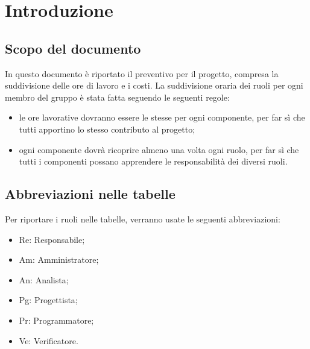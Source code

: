 \section{Introduzione}
\subsection{Scopo del documento}
In questo documento è riportato il preventivo per il progetto, compresa la suddivisione delle ore di lavoro e i costi.
La suddivisione oraria dei ruoli per ogni membro del gruppo è stata fatta seguendo le seguenti regole:
    \begin{itemize}
        \item le ore lavorative dovranno essere le stesse per ogni componente, per far sì che tutti apportino lo stesso contributo al progetto;
        \item ogni componente dovrà ricoprire almeno una volta ogni ruolo, per far sì che tutti i componenti possano apprendere le responsabilità dei diversi ruoli.
        
    \end{itemize}

\subsection{Abbreviazioni nelle tabelle}
Per riportare i ruoli nelle tabelle, verranno usate le seguenti abbreviazioni:

    \begin{itemize}
    \item Re: Responsabile;
    \item Am: Amministratore;
    \item An: Analista; 
    \item Pg: Progettista;
    \item Pr: Programmatore;
    \item Ve: Verificatore.
    \end{itemize}




    